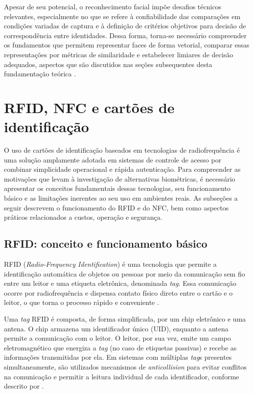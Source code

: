 Apesar de seu potencial, o reconhecimento facial impõe desafios técnicos relevantes, especialmente no que se refere à confiabilidade das comparações em condições variadas de captura e à definição de critérios objetivos para decisão de correspondência entre identidades. Dessa forma, torna-se necessário compreender os fundamentos que permitem representar faces de forma vetorial, comparar essas representações por métricas de similaridade e estabelecer limiares de decisão adequados, aspectos que são discutidos nas seções subsequentes desta fundamentação teórica \cite{hassaballah2015face}.


\section{RFID, NFC e cartões de identificação}

O uso de cartões de identificação baseados em tecnologias de radiofrequência é uma solução amplamente adotada em sistemas de controle de acesso por combinar simplicidade operacional e rápida autenticação. Para compreender as motivações que levam à investigação de alternativas biométricas, é necessário apresentar os conceitos fundamentais dessas tecnologias, seu funcionamento básico e as limitações inerentes ao seu uso em ambientes reais. As subseções a seguir descrevem o funcionamento do \acs{RFID} e do \acs{NFC}, bem como aspectos práticos relacionados a custos, operação e segurança.

\subsection{RFID: conceito e funcionamento básico}

\acs{RFID} (\textit{Radio-Frequency Identification}) é uma tecnologia que permite a identificação automática de objetos ou pessoas por meio da comunicação sem fio entre um leitor e uma etiqueta eletrônica, denominada \textit{tag}. Essa comunicação ocorre por radiofrequência e dispensa contato físico direto entre o cartão e o leitor, o que torna o processo rápido e conveniente \cite{chatmon2006secure}.

Uma \textit{tag} \acs{RFID} é composta, de forma simplificada, por um chip eletrônico e uma antena. O chip armazena um identificador único (\acs{UID}), enquanto a antena permite a comunicação com o leitor. O leitor, por sua vez, emite um campo eletromagnético que energiza a \textit{tag} (no caso de etiquetas passivas) e recebe as informações transmitidas por ela. Em sistemas com múltiplas \textit{tag}s presentes simultaneamente, são utilizados mecanismos de \textit{anticollision} para evitar conflitos na comunicação e permitir a leitura individual de cada identificador, conforme descrito por \textcite{finkenzeller2010rfid}.

